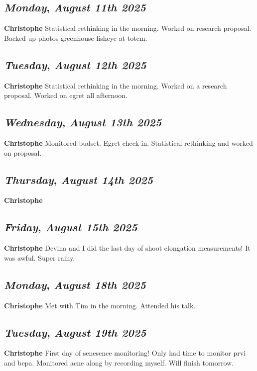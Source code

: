 \def\day{\textit{August 11th 2025}}
\def\weekday{\textit{Monday}}
\subsection*{\weekday, \day}
\textbf {Christophe}
Statistical rethinking in the morning. Worked on research proposal. Backed up photos greenhouse fisheye at totem.

\def\day{\textit{August 12th 2025}}
\def\weekday{\textit{Tuesday}}
\subsection*{\weekday, \day}
\textbf {Christophe}
Statistical rethinking in the morning. Worked on a research proposal. Worked on egret all afternoon. 

\def\day{\textit{August 13th 2025}}
\def\weekday{\textit{Wednesday}}
\subsection*{\weekday, \day}
\textbf {Christophe}
Monitored budset. Egret check in. Statistical rethinking and worked on proposal.

\def\day{\textit{August 14th 2025}}
\def\weekday{\textit{Thursday}}
\subsection*{\weekday, \day}
\textbf {Christophe}

\def\day{\textit{August 15th 2025}}
\def\weekday{\textit{Friday}}
\subsection*{\weekday, \day}
\textbf {Christophe}
Devina and I did the last day of shoot elongation measurements! It was awful. Super rainy.

\def\day{\textit{August 18th 2025}}
\def\weekday{\textit{Monday}}
\subsection*{\weekday, \day}
\textbf {Christophe}
Met with Tim in the morning. Attended his talk. 

\def\day{\textit{August 19th 2025}}
\def\weekday{\textit{Tuesday}}
\subsection*{\weekday, \day}
\textbf {Christophe}
First day of senesence monitoring! Only had time to monitor prvi and bepa. Monitored acne along by recording myself. Will finish tomorrow. 

